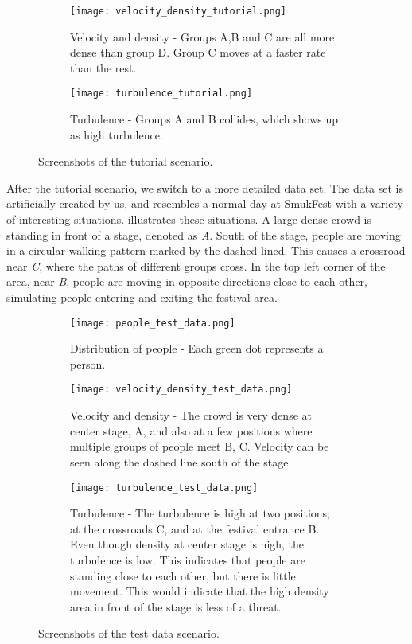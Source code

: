 \begin{figure}[htbp]
\begin{subfigure}[t]{.49\linewidth}
    \centering
    \texttt{[image: velocity\_density\_tutorial.png]}
    \caption{Velocity and density - Groups A,B and C are all more dense than group D. Group C moves at a faster rate than the rest.}
\end{subfigure}
\enspace
\begin{subfigure}[t]{.49\linewidth}
    \centering
    \texttt{[image: turbulence\_tutorial.png]}
    \caption{Turbulence - Groups A and B collides, which shows up as high turbulence.}
\end{subfigure}
\caption{Screenshots of the tutorial scenario.}
\label{fig:tutorial_screens}
\end{figure}

After the tutorial scenario, we switch to a more detailed data set. The data set is artificially created by us, and resembles a normal day at SmukFest with a variety of interesting situations.  illustrates these situations. A large dense crowd is standing in front of a stage, denoted as \emph{A}. South of the stage, people are moving in a circular walking pattern marked by the dashed lined. This causes a crossroad near \emph{C}, where the paths of different groups cross. In the top left corner of the area, near \emph{B}, people are moving in opposite directions close to each other, simulating people entering and exiting the festival area.

\begin{figure}[htbp]
\begin{subfigure}[t]{.49\linewidth}
    \centering
    \texttt{[image: people\_test\_data.png]}
    \caption{Distribution of people - Each green dot represents a person.}
\end{subfigure}
\enspace
\begin{subfigure}[t]{.49\linewidth}
    \centering
    \texttt{[image: velocity\_density\_test\_data.png]}
    \caption{Velocity and density - The crowd is very dense at center stage, A, and also at a few positions where multiple groups of people meet B, C. Velocity can be seen along the dashed line south of the stage.}
\end{subfigure}
\enspace
\begin{subfigure}[t]{.49\linewidth}
    \centering
    \texttt{[image: turbulence\_test\_data.png]}
    \caption{Turbulence - The turbulence is high at two positions; at the crossroads C, and at the festival entrance B. Even though density at center stage is high, the turbulence is low. This indicates that people are standing close to each other, but there is little movement. This would indicate that the high density area in front of the stage is less of a threat.}
\end{subfigure}
\caption{Screenshots of the test data scenario.}
\label{fig:test_data_screens}
\end{figure}

